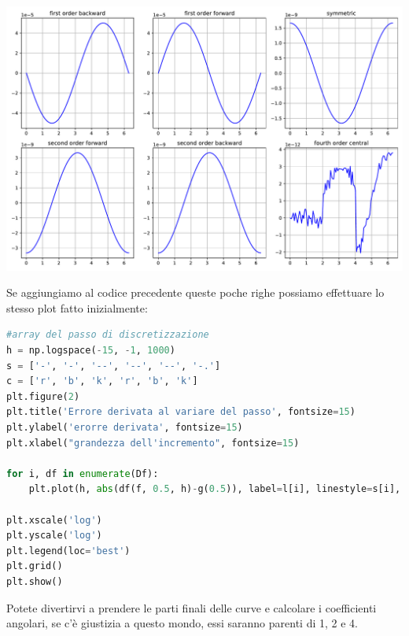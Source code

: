 \documentclass[10pt,a4paper]{article}
\begin{document}
\begin{center}
\includegraphics[scale=0.5]{img/cfr_deriv.pdf}
\end{center}
Se aggiungiamo al codice precedente queste poche righe possiamo effettuare lo stesso plot fatto inizialmente:
\begin{lstlisting}[language=Python]
#array del passo di discretizzazione
h = np.logspace(-15, -1, 1000)
s = ['-', '-', '--', '--', '--', '-.']
c = ['r', 'b', 'k', 'r', 'b', 'k']
plt.figure(2)
plt.title('Errore derivata al variare del passo', fontsize=15)
plt.ylabel('erorre derivata', fontsize=15)
plt.xlabel("grandezza dell'incremento", fontsize=15)

for i, df in enumerate(Df):
    plt.plot(h, abs(df(f, 0.5, h)-g(0.5)), label=l[i], linestyle=s[i], color=c[i])

plt.xscale('log')
plt.yscale('log')
plt.legend(loc='best')
plt.grid()
plt.show()
\end{lstlisting}
\begin{center}
\end{center}
Potete divertirvi a prendere le parti finali delle curve e calcolare i coefficienti angolari, se c'è giustizia a questo mondo, essi saranno parenti di 1, 2 e 4.
\end{document}
